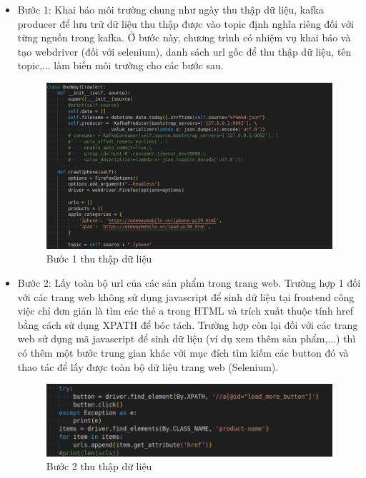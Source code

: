\documentclass[../DoAn.tex]{subfiles}
\begin{document}
\begin{itemize}
    \item Bước 1: Khai báo môi trường chung như ngày thu thập dữ liệu, kafka producer để lưu trữ dữ liệu thu thập được vào topic định nghĩa riêng đối với từng nguồn trong kafka. Ở bước này, chương trình có nhiệm vụ khai báo và tạo webdriver (đối với selenium), danh sách url gốc để thu thập dữ liệu, tên topic,... làm biến môi trường cho các bước sau.

    \begin{figure}[H]
        \centering
        \includegraphics[scale=0.4]{Hinhve/step1_crawl_system.png}
        \caption{Bước 1 thu thập dữ liệu}
        \label{fig:my_label2}
    \end{figure}

    \item Bước 2: Lấy toàn bộ url của các sản phẩm trong trang web. Trường hợp 1 đối với các trang web không sử dụng javascript để sinh dữ liệu tại frontend công việc chỉ đơn giản là tìm các thẻ a trong HTML và trích xuất thuộc tính href bằng cách sử dụng XPATH để bóc tách. Trường hợp còn lại đối với các trang web sử dụng mã javascript để sinh dữ liệu (ví dụ xem thêm sản phẩm,...) thì có thêm một bước trung gian khác với mục đích tìm kiếm các button đó và thao tác để lấy được toàn bộ dữ liệu trang web (Selenium). 

    \begin{figure}[H]
        \centering
        \includegraphics[scale=0.5]{Hinhve/step2_crawl_system.png}
        \caption{Bước 2 thu thập dữ liệu}
        \label{fig:my_label2}
    \end{figure}


\end{itemize}
\end{document}
